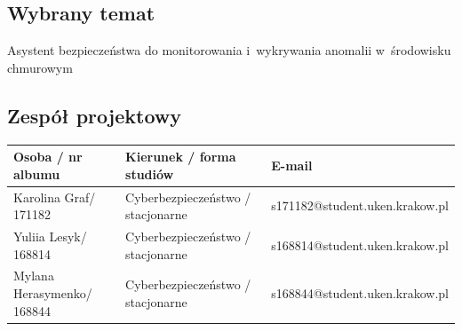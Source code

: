 \documentclass[11pt,a4paper,oneside]{article}
\newif\ifpodpowiedzi
\newcommand{\podpowiedz}[1]{\ifpodpowiedzi\par\begingroup\small\color{hintcolor}\textit{Wskazówka: #1}\par\endgroup\fi}
\newcommand{\tytulprojektu}{Asystent bezpieczeństwa do monitorowania i~wykrywania anomalii w~środowisku chmurowym}
\newcommand{\studentA}{Karolina Graf}
\newcommand{\studentB}{Yuliia Lesyk}
\newcommand{\studentC}{Mylana Herasymenko}
\newcommand{\albumA}{171182}
\newcommand{\albumB}{168814}
\newcommand{\albumC}{168844}
\begin{document}
\subsection{Wybrany temat}
\podpowiedz{Podaj uzgodniony tytuł projektu, zgodny ze stroną tytułową. Powinien wskazywać przedmiot i cel pracy.}
\tytulprojektu

\subsection{Zespół projektowy}
\podpowiedz{Podaj dane wszystkich członków zespołu. Zespół jest co do zasady trzyosobowy; w wyjątkowych, uzasadnionych przypadkach, za zgodą dyrekcji instytutu, może być dwuosobowy. W takim przypadku usuń dane trzeciej osoby ze strony tytułowej i tabeli.}
\begin{tabularx}{\textwidth}{@{}Y Y Y@{}}
\toprule
Osoba / nr albumu & Kierunek / forma studiów & E-mail\\
\midrule
\studentA / \albumA & {Cyberbezpieczeństwo / stacjonarne} & {s171182@student.uken.krakow.pl}\\
\studentB / \albumB & {Cyberbezpieczeństwo / stacjonarne} & {s168814@student.uken.krakow.pl}\\
\studentC / \albumC & {Cyberbezpieczeństwo / stacjonarne} & {s168844@student.uken.krakow.pl}\\
\bottomrule
\end{tabularx}
\newpage
\end{document}
